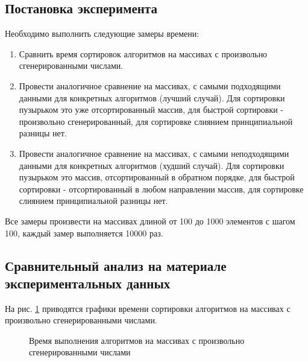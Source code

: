\documentclass[a4paper,12pt]{article}
\begin{document}
    \subsection{Постановка эксперимента}
    
    Необходимо выполнить следующие замеры времени:
    \begin{enumerate} 
        \item Сравнить время сортировок алгоритмов на массивах с произвольно сгенерированными числами.
        \item Провести аналогичное сравнение на массивах, с самыми подходящими данными для конкретных алгоритмов (лучший случай). Для сортировки пузырьком это уже отсортированный массив, для быстрой сортировки - произвольно сгенерированный, для сортировке слиянием принципиальной разницы нет.
        \item Провести аналогичное сравнение на массивах, с самыми неподходящими данными для конкретных алгоритмов (худший случай). Для сортировки пузырьком это  массив, отсортированный в обратном порядке, для быстрой сортировки - отсортированный в любом направлении массив, для сортировке слиянием принципиальной разницы нет.
        
    \end{enumerate} 
    
    Все замеры произвести на массивах длиной от 100 до 1000 элементов с шагом 100, каждый замер выполняется 10000 раз.
    
    
    \subsection{Сравнительный анализ на материале экспериментальных данных}
        На рис. \ref{fig:gtaf_1} приводятся графики времени сортировки алгоритмов на массивах с произвольно сгенерированными числами.
        
        \begin{figure}[h!]
            \caption{Время выполнения алгоритмов на массивах с произвольно сгенерированными числами}
            \label{fig:gtaf_1}
        \end{figure}
        
\end{document}
